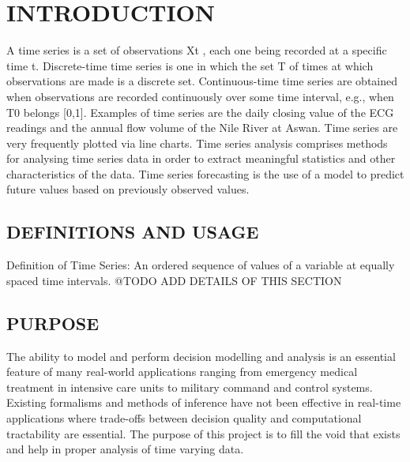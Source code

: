 \documentclass[12pt]{report}
\begin{document}
\chapter{INTRODUCTION}
A time series is a set of observations Xt , each one being recorded at a specific time t. Discrete-time time series is one in which the set T of times at which observations are made is a discrete set. Continuous-time time series are obtained when observations are recorded continuously over some time interval, e.g., when T0 belongs [0,1]. Examples of time series are the daily closing value of the ECG readings and the annual flow volume of the Nile River at Aswan. Time series are very frequently plotted via line charts. Time series analysis comprises methods for analysing time series data in order to extract meaningful statistics and other characteristics of the data. Time series forecasting is the use of a model to predict future values based on previously observed values.  
\section{DEFINITIONS AND USAGE}
Definition of Time Series: An ordered sequence of values of a variable at equally spaced time intervals.
@TODO ADD DETAILS OF THIS SECTION
\section{PURPOSE}
The ability to model and perform decision modelling and analysis is an essential feature of many real-world applications ranging from emergency medical treatment in intensive care units to military command and control systems. Existing formalisms and methods of inference have not been effective in real-time applications where trade-offs between decision quality and computational tractability are essential. The purpose of this project is to fill the void that exists and help in proper analysis of time varying data.
\end{document}
